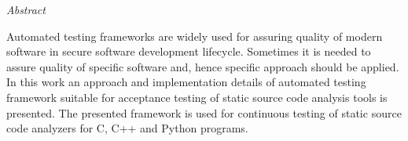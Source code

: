 \textit{Abstract}

Automated testing frameworks are widely used for assuring quality of modern software in secure software development lifecycle. Sometimes it is needed to assure quality of specific software and, hence specific approach should be applied. In this work an approach and implementation details of automated testing framework suitable for acceptance testing of static source code analysis tools is presented. The presented framework is used for continuous testing of static source code analyzers for C, C++ and Python programs.
